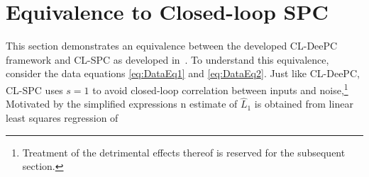 \section{Equivalence to Closed-loop \acs{SPC}}
This section demonstrates an equivalence between the developed \ac{CL-DeePC} framework and \ac{CL-SPC} as developed in~\cite{Dong2008}. To understand this equivalence, consider the data equations \eqref{eq:DataEq1} and \eqref{eq:DataEq2}. Just like \ac{CL-DeePC}, \ac{CL-SPC} uses $s=1$ to avoid closed-loop correlation between inputs and noise,\footnote{Treatment of the detrimental effects thereof is reserved for the subsequent section.} Motivated by the simplified expressions n estimate of $\widehat{L}_1$ is obtained from linear least squares regression of 